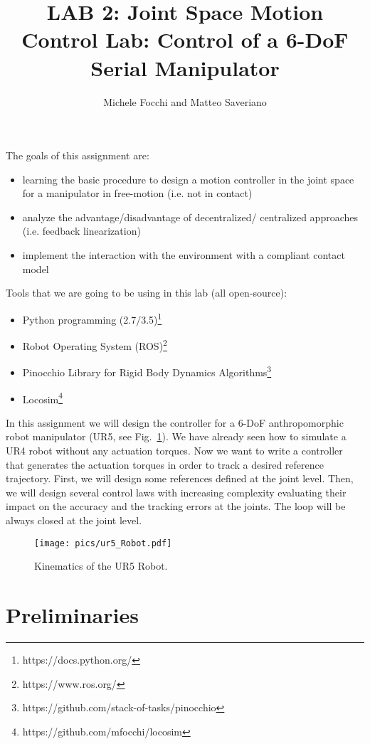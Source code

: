 \documentclass[11pt]{article}
\title{LAB 2: Joint Space Motion Control Lab: Control of a 6-DoF Serial Manipulator}
\author{Michele Focchi and Matteo Saveriano}
\date{}
\begin{document}
	\maketitle
	\noindent
	The goals of this assignment are:
	\begin{itemize}
		\item learning the basic procedure to design a motion controller in the joint space for a manipulator in free-motion (i.e. not in contact)
		\item analyze the advantage/disadvantage of decentralized/ centralized approaches (i.e. feedback linearization)
		\item implement the interaction with the environment with a compliant contact model	 
	\end{itemize}
	
	\noindent
	Tools that we are going to be using in this lab (all open-source):
	\begin{itemize}
		\item Python programming (2.7/3.5)\footnote{https://docs.python.org/}
		\item Robot Operating System (ROS)\footnote{https://www.ros.org/}
		\item Pinocchio Library for Rigid Body Dynamics Algorithms\footnote{https://github.com/stack-of-tasks/pinocchio}
		\item Locosim\footnote{https://github.com/mfocchi/locosim}
	\end{itemize}
	In this assignment we will  design the controller for a 6-DoF anthropomorphic robot manipulator (UR5, see  Fig.~\ref{fig:UR5}). We have already seen how to simulate a UR4 robot without any actuation torques. Now we want to write a controller that generates the actuation torques in order to track a desired reference trajectory. First, we will design some references defined at the joint level. Then, we will design several control laws with increasing complexity evaluating their impact on the accuracy and the tracking errors at the joints. The loop will be always closed at the joint level.  
 
 \begin{figure}[bht]
 	\centering
 	\texttt{[image: pics/ur5\_Robot.pdf]}
 	\caption{Kinematics of the UR5 Robot.}
 	\label{fig:UR5}
 \end{figure}

\section{Preliminaries}
\end{document}
